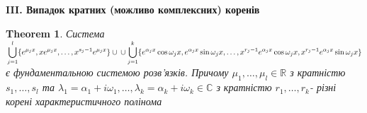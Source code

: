 \documentclass[a4paper, 10pt]{article}
\theoremstyle{theoremdd}
\newtheorem{theorem}{Theorem}[subsection]
\theoremstyle{theoremdd}
\theoremstyle{theoremdd}
\theoremstyle{theoremdd}
\theoremstyle{theoremdd}
\theoremstyle{theoremdd}
\theoremstyle{theoremdd}
\theoremstyle{theoremdd}
\begin{document}
\textbf{III. Випадок кратних (можливо комплексних) коренів}
\begin{theorem}
 Система $\\ \displaystyle \bigcup_{j=1}^l \{e^{\mu_j x}, x e^{\mu_j x}, \dots, x^{s_j-1}e^{\mu_j x}\} \cup \\ \cup \displaystyle \bigcup_{j=1}^k \{e^{\alpha_j x} \cos \omega_j x, e^{\alpha_j x} \sin \omega_j x, \dots, x^{r_j-1}e^{\alpha_j x} \cos \omega_j x, x^{r_j-1}e^{\alpha_j x} \sin \omega_j x\}$ \\ є фундаментальною системою розв'язків. Причому $\mu_1, \dots, \mu_l \in \mathbb{R}$ з кратністю $s_1, \dots, s_l$ та $\lambda_1 = \alpha_1 + i\omega_1, \dots, \lambda_k = \alpha_k + i\omega_k \in \mathbb{C}$ з кратністю $r_1, \dots, r_k$- різні корені характеристичного полінома
\end{theorem}
\end{document}
